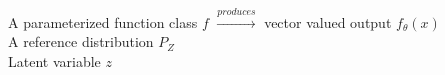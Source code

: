 \documentclass[preview]{standalone}
\begin{document}
A parameterized function class $f$ $\xrightarrow{produces}$ vector valued output $f_\theta(x)$\\A reference distribution  $P_Z$\\Latent variable $z$\\
\end{document}
